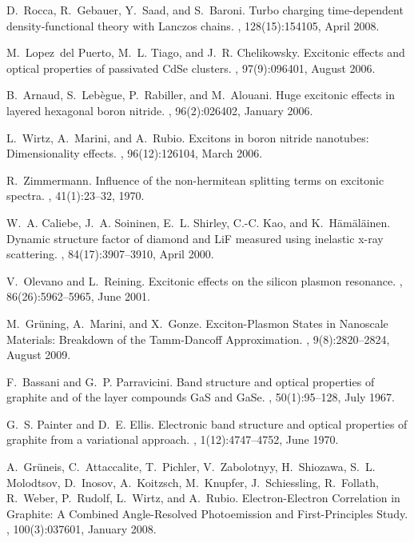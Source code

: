 \documentclass[aps,prb,10pt,showpacs,superscriptaddress,twocolumn,notitlepage]{revtex4-1}
\begin{document}
\begin{thebibliography}{10}
D.~Rocca, R.~Gebauer, Y.~Saad, and S.~Baroni.
\newblock Turbo charging time-dependent density-functional theory with
  {Lanczos} chains.
, 128(15):154105, April 2008.

M.~Lopez~del Puerto, M.~L. Tiago, and J.~R. Chelikowsky.
\newblock Excitonic effects and optical properties of passivated {CdSe}
  clusters.
, 97(9):096401, August 2006.

B.~Arnaud, S.~Leb{\`e}gue, P.~Rabiller, and M.~Alouani.
\newblock Huge excitonic effects in layered hexagonal boron nitride.
, 96(2):026402, January 2006.

L.~Wirtz, A.~Marini, and A.~Rubio.
\newblock Excitons in boron nitride nanotubes: Dimensionality effects.
, 96(12):126104, March 2006.

R.~Zimmermann.
\newblock Influence of the non-hermitean splitting terms on excitonic spectra.
, 41(1):23--32, 1970.

W.~A. Caliebe, J.~A. Soininen, E.~L. Shirley, C.-C. Kao, and
  K.~H{\"a}m{\"a}l{\"a}inen.
\newblock Dynamic structure factor of diamond and {LiF} measured using
  inelastic x-ray scattering.
, 84(17):3907--3910, April 2000.

V.~Olevano and L.~Reining.
\newblock Excitonic effects on the silicon plasmon resonance.
, 86(26):5962--5965, June 2001.

M.~Gr{\"u}ning, A.~Marini, and X.~Gonze.
\newblock Exciton-{Plasmon} {States} in {Nanoscale} {Materials}: {Breakdown} of
  the {Tamm}-{Dancoff} {Approximation}.
, 9(8):2820--2824, August 2009.

F.~Bassani and G.~P. Parravicini.
\newblock Band structure and optical properties of graphite and of the layer
  compounds {GaS} and {GaSe}.
, 50(1):95--128, July 1967.

G.~S. Painter and D.~E. Ellis.
\newblock Electronic band structure and optical properties of graphite from a
  variational approach.
, 1(12):4747--4752, June 1970.

A.~Gr{\"u}neis, C.~Attaccalite, T.~Pichler, V.~Zabolotnyy, H.~Shiozawa, S.~L.
  Molodtsov, D.~Inosov, A.~Koitzsch, M.~Knupfer, J.~Schiessling, R.~Follath,
  R.~Weber, P.~Rudolf, L.~Wirtz, and A.~Rubio.
\newblock Electron-{Electron} {Correlation} in {Graphite}: {A} {Combined}
  {Angle}-{Resolved} {Photoemission} and {First}-{Principles} {Study}.
, 100(3):037601, January 2008.


\end{thebibliography}
\end{document}
